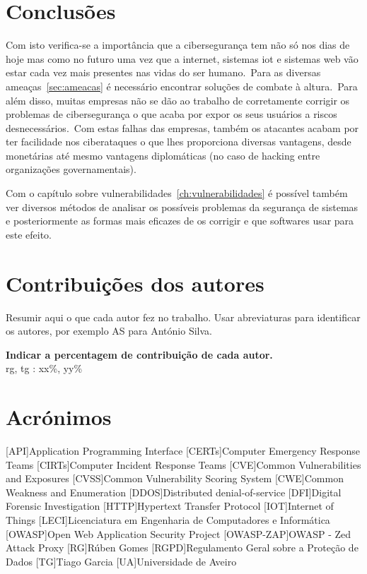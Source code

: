 \documentclass{report}
\begin{document}
\chapter{Conclusões}
\label{ch:conclusao}
Com isto verifica-se a importância que a cibersegurança tem não só nos dias de hoje mas como no futuro uma vez que a internet, sistemas \ac{iot} e sistemas web vão estar cada vez mais presentes nas vidas do ser humano.\ Para as diversas ameaças~\ref{sec:ameacas} é necessário encontrar soluções de combate à altura.\ Para além disso, muitas empresas não se dão ao trabalho de corretamente corrigir os problemas de cibersegurança o que acaba por expor os seus usuários a riscos desnecessários.\ Com estas falhas das empresas, também os atacantes acabam por ter facilidade nos ciberataques o que lhes proporciona diversas vantagens, desde monetárias até mesmo vantagens diplomáticas (no caso de hacking entre organizações governamentais).
\par Com o capítulo sobre vulnerabilidades~\ref{ch:vulnerabilidades} é possível também ver diversos métodos de analisar os possíveis problemas da segurança de sistemas e posteriormente as formas mais eficazes de os corrigir e que softwares usar para este efeito.

\chapter*{Contribuições dos autores}
Resumir aqui o que cada autor fez no trabalho.
Usar abreviaturas para identificar os autores,
por exemplo AS para António Silva.

\vspace{10pt}
\textbf{Indicar a percentagem de contribuição de cada autor.}\\

\ac{rg}, \ac{tg} : xx\%, yy\%\\


\chapter*{Acrónimos}
\begin{acronym}
    [API]{Application Programming Interface}
    [CERTs]{Computer Emergency Response Teams}
    [CIRTs]{Computer Incident Response Teams}
    [CVE]{Common Vulnerabilities and Exposures}
    [CVSS]{Common Vulnerability Scoring System}
    [CWE]{Common Weakness and Enumeration}
    [DDOS]{Distributed denial-of-service}
    [DFI]{Digital Forensic Investigation}
    [HTTP]{Hypertext Transfer Protocol}
    [IOT]{Internet of Things}
    [LECI]{Licenciatura em Engenharia de Computadores e Informática}
    [OWASP]{Open Web Application Security Project}
    [OWASP-ZAP]{OWASP - Zed Attack Proxy}
    [RG]{Rúben Gomes}
    [RGPD]{Regulamento Geral sobre a Proteção de Dados}
    [TG]{Tiago Garcia}
    [UA]{Universidade de Aveiro}
\end{acronym}


\printbibliography
\end{document}
